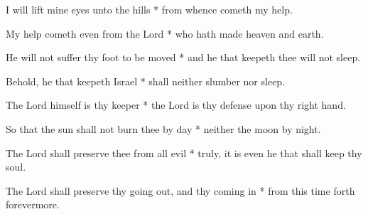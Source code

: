 I will lift mine eyes unto the hills * from whence cometh my help.

My help cometh even from the Lord * who hath made heaven and earth.
	
He will not suffer thy foot to be moved * and he that keepeth thee will not sleep.
	
Behold, he that keepeth Israel * shall neither slumber nor sleep.
	
The Lord himself is thy keeper * the Lord is thy defense upon thy right hand.
	
So that the sun shall not burn thee by day * neither the moon by night.
	
The Lord shall preserve thee from all evil * truly, it is even he that shall keep thy soul.
	
The Lord shall preserve thy going out, and thy coming in * from this time forth forevermore.